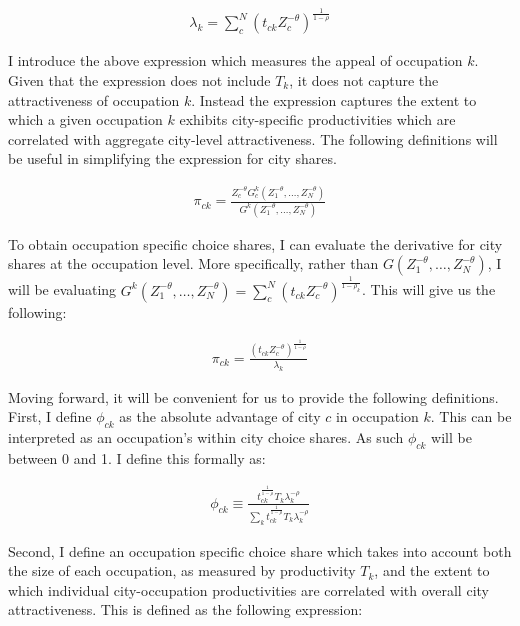 \documentclass[10pt]{article}
\begin{document}
\begin{align*}
    \lambda_{k} = \sum_{c}^{N} \left( t_{ck} Z_{c}^{-\theta} \right)^{\frac{1}{1-\rho}}
\end{align*}

I introduce the above expression which measures the appeal of occupation $k$. Given that the expression does not include $T_k$, it does not capture the attractiveness of occupation $k$. Instead the expression captures the extent to which a given occupation $k$ exhibits city-specific productivities which are correlated with aggregate city-level attractiveness. The following definitions will be useful in simplifying the expression for city shares.

\begin{align*}
    \pi_{ck} = \frac{Z_c^{- \theta} G_c^k(Z_1^{- \theta}, \dots, Z_N^{- \theta})}{G^k(Z_1^{- \theta}, \dots, Z_N^{- \theta})}
\end{align*}

To obtain occupation specific choice shares, I can evaluate the derivative for city shares at the occupation level. More specifically, rather than $G(Z_1^{- \theta}, \dots, Z_N^{- \theta})$, I will be evaluating $G^k(Z_1^{- \theta}, \dots, Z_N^{- \theta}) = \sum_{c}^{N} (t_{ck} Z_c^{- \theta})^{\frac{1}{1 - \rho_k}}$. This will give us the following:

\begin{align}
    \pi_{ck} = \frac{(t_{ck} Z_c^{-\theta})^{\frac{1}{1 - \rho}}}{\lambda_k}
    \label{city_occuaption_shares}
\end{align}

Moving forward, it will be convenient for us to provide the following definitions. First, I define $\phi_{ck}$ as the absolute advantage of city $c$ in occupation $k$. This can be interpreted as an occupation's within city choice shares. As such $\phi_{ck}$ will be between 0 and 1. I define this formally as:

\begin{align}
    \phi_{ck} \equiv \frac{{t^{\frac{1}{1-\rho}}_{ck}}{T_{k}}\lambda_{k}^{-\rho}}{\sum\limits_{k}{t^{\frac{1}{1-\rho}}_{ck}}{T_{k}}\lambda_{k}^{-\rho}}
    \label{occupation_by_city_shares}
\end{align}

Second, I define an occupation specific choice share which takes into account both the size of each occupation, as measured by productivity $T_k$, and the extent to which individual city-occupation productivities are correlated with overall city attractiveness. This is defined as the following expression:
\end{document}
